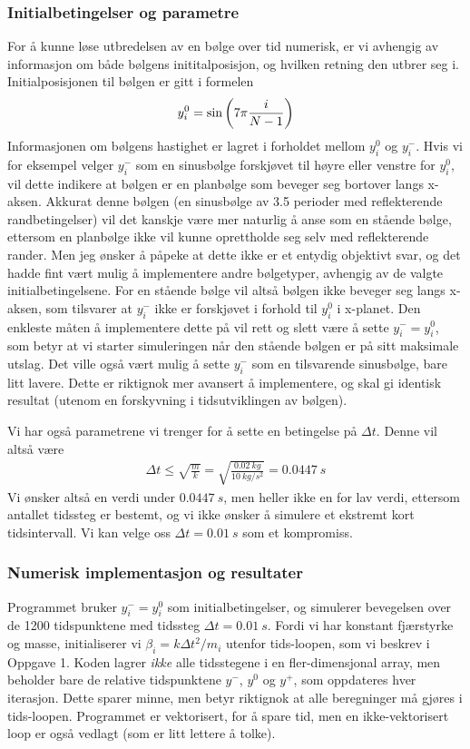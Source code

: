 \documentclass[12p,a4paper]{report}
\begin{document}
\subsubsection*{Initialbetingelser og parametre}
For å kunne løse utbredelsen av en bølge over tid numerisk, er vi avhengig av informasjon om både bølgens inititalposisjon, og hvilken retning den utbrer seg i. Initialposisjonen til bølgen er gitt i formelen
\begin{align}
\label{eqn:sinus}
y_i^0 = \sin\qty(7\pi\frac{i}{N-1})
\end{align}
Informasjonen om bølgens hastighet er lagret i forholdet mellom $y_i^0$ og $y_i^-$. Hvis vi for eksempel velger $y_i^-$ som en sinusbølge forskjøvet til høyre eller venstre for $y_i^0$, vil dette indikere at bølgen er en planbølge som beveger seg bortover langs x-aksen. Akkurat denne bølgen (en sinusbølge av 3.5 perioder med reflekterende randbetingelser) vil det kanskje være mer naturlig å anse som en stående bølge, ettersom en planbølge ikke vil kunne oprettholde seg selv med reflekterende rander. Men jeg ønsker å påpeke at dette ikke er et entydig objektivt svar, og det hadde fint vært mulig å implementere andre bølgetyper, avhengig av de valgte initialbetingelsene. For en stående bølge vil altså bølgen ikke beveger seg langs x-aksen, som tilsvarer at $y_i^-$ ikke er forskjøvet i forhold til $y_i^0$ i x-planet. Den enkleste måten å implementere dette på vil rett og slett være å sette $y_i^- = y_i^0$, som betyr at vi starter simuleringen når den stående bølgen er på sitt maksimale utslag. Det ville også vært mulig å sette $y_i^-$ som en tilsvarende sinusbølge, bare litt lavere. Dette er riktignok mer avansert å implementere, og skal gi identisk resultat (utenom en forskyvning i tidsutviklingen av bølgen).

Vi har også parametrene vi trenger for å sette en betingelse på $\Delta t$. Denne vil altså være
\begin{align*}
\Delta t \leq \sqrt{\frac{m}{k}} = \sqrt{\frac{\SI{0.02}{kg}}{\SI{10}{kg/s^2}}} = \SI{0.0447}{s}
\end{align*}
Vi ønsker altså en verdi under $\SI{0.0447}{s}$, men heller ikke en for lav verdi, ettersom antallet tidssteg er bestemt, og vi ikke ønsker å simulere et ekstremt kort tidsintervall. Vi kan velge oss $\Delta t = \SI{0.01}{s}$ som et kompromiss.


\subsubsection*{Numerisk implementasjon og resultater}
Programmet bruker $y_i^- = y_i^0$ som initialbetingelser, og simulerer bevegelsen over de 1200 tidspunktene med tidssteg $\Delta t = \SI{0.01}{s}$. Fordi vi har konstant fjærstyrke og masse, initialiserer vi $\beta_i = k \Delta t^2/m_i$ utenfor tids-loopen, som vi beskrev i Oppgave 1. Koden lagrer \textit{ikke} alle tidsstegene i en fler-dimensjonal array, men beholder bare de relative tidspunktene $y^-$, $y^0$ og $y^+$, som oppdateres hver iterasjon. Dette sparer minne, men betyr riktignok at alle beregninger må gjøres i tids-loopen. Programmet er vektorisert, for å spare tid, men en ikke-vektorisert loop er også vedlagt (som er litt lettere å tolke).
\end{document}
